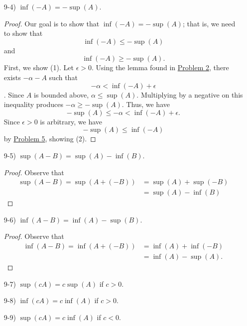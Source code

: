 \documentclass[11pt,a4paper]{article}
\begin{document}
\begin{enumerate}
\begin{enumerate}
\begin{proof}
            \end{proof}
        \item[9-4)] \( \inf(-A) = - \sup(A) \).
            \begin{proof}
            Our goal is to show that  \( \inf(-A) = - \sup(A) \); that is, we need to show that 
            \[ \inf(-A) \leq - \sup(A) \tag{1} \]
            and
            \[  \inf(-A) \geq - \sup(A). \tag{2} \]
            First, we show (1). Let \( \epsilon > 0  \).  Using the lemma found in {\hyperref[Problem 2]{Problem 2}}, there exists \( - \alpha -A  \) such that 
            \[  - \alpha < \inf(-A) + \epsilon  \].
            Since \( A  \) is bounded above, \( \alpha \leq \sup(A) \). Multiplying by a negative on this inequality produces \( - \alpha \geq - \sup(A) \). Thus, we have      
            \[ - \sup(A) \leq - \alpha < \inf(-A) + \epsilon.   \]
            Since \( \epsilon > 0  \) is arbitrary, we have
            \[  - \sup(A) \leq \inf(-A) \]
            by {\hyperref[Problem 5]{Problem 5}}, showing (2). 
            \end{proof}
        \item[9-5)] \( \sup (A -B) = \sup(A) - \inf(B) \).
            \begin{proof}
            Observe that 
            \begin{align*}
                \sup(A - B) = \sup(A + (-B)) &= \sup(A) + \sup(-B) \tag{9-2)} \\
                                             &= \sup(A) - \inf(B) \tag{9-3)}
            \end{align*}
            \end{proof}
        \item[9-6)] \( \inf(A - B) = \inf(A) - \sup(B) \).
            \begin{proof}
            Observe that
            \begin{align*}
                \inf(A -B) = \inf(A + (-B)) &= \inf(A) + \inf(-B) \tag{9-1)} \\
                                            &= \inf(A) - \sup(A). \tag{9-4)}
            \end{align*}
            \end{proof}
        \item[9-7)] \( \sup(cA) = c \sup (A)  \) if \( c > 0  \).
        \item[9-8)] \( \inf(cA) = c \inf (A)  \) if \( c > 0  \).
        \item[9-9)] \( \sup(cA) = c \inf(A) \) if \( c < 0  \).

\end{enumerate}
\end{enumerate}
\end{document}
